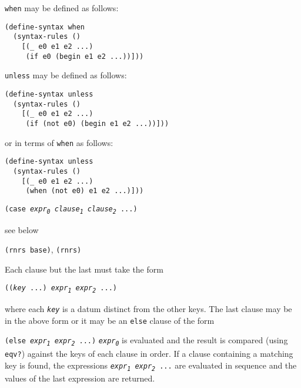 \texttt{when} may be defined as follows:

\begin{alltt}
(define-syntax when
  (syntax-rules ()
    [(\_{} e0 e1 e2 ...)
     (if e0 (begin e1 e2 ...))]))
\end{alltt}

\texttt{unless} may be defined as follows:

\begin{alltt}
(define-syntax unless
  (syntax-rules ()
    [(\_{} e0 e1 e2 ...)
     (if (not e0) (begin e1 e2 ...))]))
\end{alltt}


or in terms of \texttt{when} as follows:


\begin{alltt}
(define-syntax unless
  (syntax-rules ()
    [(\_{} e0 e1 e2 ...)
     (when (not e0) e1 e2 ...)]))
\end{alltt}

\begin{description}

\label{control_s18}\item[syntax] \texttt{(case \textit{expr\textsubscript{0}} \textit{clause\textsubscript{1}} \textit{clause\textsubscript{2}} ...)}



\item[returns] see below


\item[libraries] \texttt{(rnrs base)}, \texttt{(rnrs)}
\end{description}


Each clause but the last must take the form


\texttt{((\textit{key} ...) \textit{expr\textsubscript{1}} \textit{expr\textsubscript{2}} ...)}

where each \texttt{\textit{key}} is a datum distinct from the other keys.
The last clause may be in the above form or it may be an
\label{control_s19}\texttt{else} clause of the form


\texttt{(else \textit{expr\textsubscript{1}} \textit{expr\textsubscript{2}} ...)}
\texttt{\textit{expr\textsubscript{0}}} is evaluated and the result is compared
(using \texttt{eqv?}) against the keys of each clause in order.
If a clause containing a matching key is found, the
expressions \texttt{\textit{expr\textsubscript{1}} \textit{expr\textsubscript{2}} ...} are evaluated in sequence
and the values of the last expression are returned.

